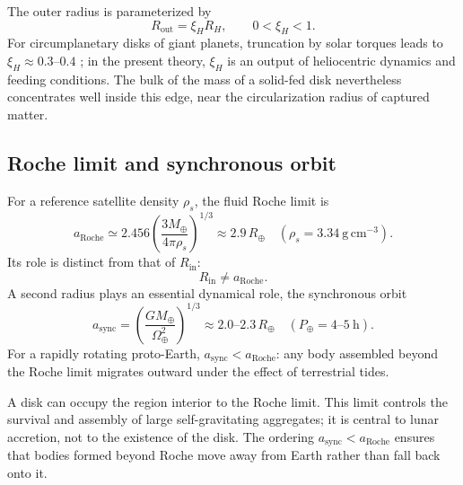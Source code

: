 \documentclass[11pt,a4paper,openany]{report}
\newcommand{\Mt}{M_{\oplus}}
\newcommand{\Rt}{R_{\oplus}}
\newcommand{\aR}{a_{\mathrm{Roche}}}
\begin{document}
The outer radius is parameterized by
\begin{equation}
R_{\mathrm{out}}=\xi_H R_H,\qquad 0<\xi_H<1.
\label{eq:Rout}
\end{equation}
For circumplanetary disks of giant planets, truncation by solar torques leads to
$\xi_H\approx0.3$--$0.4$ \cite{QuillenTrilling1998,MartinLubow2011}; in the present theory,
$\xi_H$ is an output of heliocentric dynamics and feeding conditions. The bulk of the mass of a
solid-fed disk nevertheless concentrates well inside this edge, near the circularization radius of
captured matter.

\subsection{Roche limit and synchronous orbit}

For a reference satellite density $\rho_s$, the fluid Roche limit is
\begin{equation}
\aR\simeq2.456\left(\frac{3\Mt}{4\pi\rho_s}\right)^{1/3}
\approx2.9\,\Rt\quad(\rho_s=3.34\ \mathrm{g\,cm^{-3}}).
\label{eq:Roche}
\end{equation}
Its role is distinct from that of $R_{\mathrm{in}}$:
\begin{equation}
R_{\mathrm{in}}\neq\aR.
\label{eq:RinRoche}
\end{equation}
A second radius plays an essential dynamical role, the synchronous orbit
\begin{equation}
a_{\mathrm{sync}}=\left(\frac{G\Mt}{\Omega_\oplus^2}\right)^{1/3}\approx2.0\text{--}2.3\,\Rt
\quad(P_\oplus=4\text{--}5\ \mathrm{h}).
\label{eq:async}
\end{equation}
For a rapidly rotating proto-Earth, $a_{\mathrm{sync}}<\aR$: any body assembled beyond the Roche
limit migrates outward under the effect of terrestrial tides.

\begin{lecture}
A disk can occupy the region interior to the Roche limit. This limit controls the survival and
assembly of large self-gravitating aggregates; it is central to lunar accretion, not to the
existence of the disk. The ordering $a_{\mathrm{sync}}<\aR$ ensures that bodies formed beyond Roche
move away from Earth rather than fall back onto it.
\end{lecture}
\end{document}
